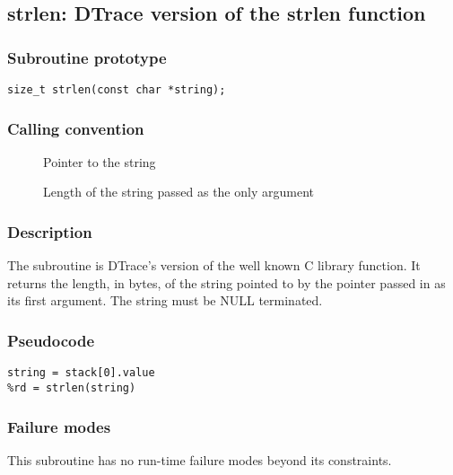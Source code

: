 \clearpage
{}
{}
\label{subr:strlen}
\subsection*{strlen: DTrace version of the strlen function}

\subsubsection*{Subroutine prototype}

\begin{verbatim}
size_t strlen(const char *string);
\end{verbatim}

\subsubsection*{Calling convention}

\begin{description}
\item[] Pointer to the string
\item[] Length of the string passed as the only argument
\end{description}

\subsubsection*{Description}

The  subroutine is DTrace's version of the well
known C library function.  It returns the length, in bytes, of the string
pointed to by the pointer passed in as its first argument. The string must be
NULL terminated.

\subsubsection*{Pseudocode}

\begin{verbatim}
string = stack[0].value
%rd = strlen(string)
\end{verbatim}

\subsubsection*{Failure modes}

This subroutine has no run-time failure modes beyond its constraints.
